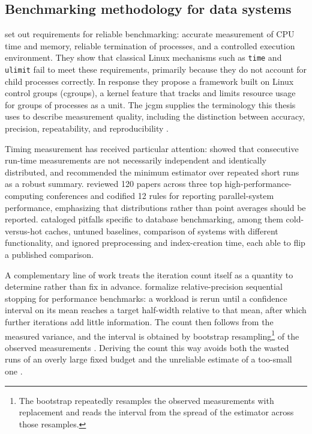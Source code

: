\subsection{Benchmarking methodology for data systems}
\label{related-work:benchmarking-methodology-for-data-systems}

\textcite{beyer_2015_benchmarking_and_resource_measurement} set out requirements for reliable benchmarking: accurate measurement of CPU time and memory, reliable termination of processes, and a controlled execution environment. They show that classical Linux mechanisms such as \texttt{time} and \texttt{ulimit} fail to meet these requirements, primarily because they do not account for child processes correctly. In response they propose a framework built on Linux control groups (cgroups), a kernel feature that tracks and limits resource usage for groups of processes as a unit. The \acrfull{jcgm} supplies the terminology this thesis uses to describe measurement quality, including the distinction between accuracy, precision, repeatability, and reproducibility \parencite{jcgm2012_international_vocabulary_of_metrology}.

Timing measurement has received particular attention: \textcite{chen2016_robust_benchmarking_noisy_environments} showed that consecutive run-time measurements are not necessarily independent and identically distributed, and recommended the minimum estimator over repeated short runs as a robust summary. \textcite{hoefler2015_scientific_benchmarking_parallel} reviewed \num{120} papers across three top high-performance-computing conferences and codified \num{12} rules for reporting parallel-system performance, emphasizing that distributions rather than point averages should be reported. \textcite{raasveldt2018_fair_benchmarking_database_systems} cataloged pitfalls specific to database benchmarking, among them cold-versus-hot caches, untuned baselines, comparison of systems with different functionality, and ignored preprocessing and index-creation time, each able to flip a published comparison.

A complementary line of work treats the iteration count itself as a quantity to determine rather than fix in advance. \textcite{georges2007_statistically_rigorous_java_performance} formalize relative-precision sequential stopping for performance benchmarks: a workload is rerun until a confidence interval on its mean reaches a target half-width relative to that mean, after which further iterations add little information. The count then follows from the measured variance, and the interval is obtained by bootstrap resampling\footnote{The bootstrap repeatedly resamples the observed measurements with replacement and reads the interval from the spread of the estimator across those resamples.} of the observed measurements \parencite{laaber2019_software_microbenchmarking_cloud}. Deriving the count this way avoids both the wasted runs of an overly large fixed budget and the unreliable estimate of a too-small one \parencite{georges2007_statistically_rigorous_java_performance}.

